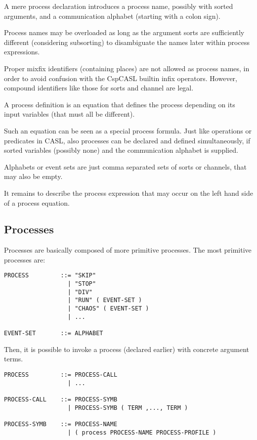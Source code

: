 \documentclass{article}
\begin{document}
A mere process declaration introduces a process name, possibly with sorted
arguments, and a communication alphabet (starting with a colon sign).

Process names may be overloaded as long as the argument sorts are sufficiently
different (considering subsorting) to disambiguate the names later within
process expressions.

Proper mixfix identifiers (containing places) are not allowed as process
names, in order to avoid confusion with the CspCASL builtin infix operators.
However, compound identifiers like those for sorts and channel are legal.

A process definition is an equation that defines the process depending on its
input variables (that must all be different).

Such an equation can be seen as a special process formula. Just like
operations or predicates in CASL, also processes can be declared and defined
simultaneously, if sorted variables (possibly none) and the communication
alphabet is supplied.

Alphabets or event sets are just comma separated sets of sorts or
channels, that may also be empty.

It remains to describe the process expression that may occur on the left hand
side of a process equation.

\subsection{Processes}

Processes are basically composed of more primitive processes. The most
primitive processes are:

\begin{verbatim}
PROCESS         ::= "SKIP"
                  | "STOP"
                  | "DIV"
                  | "RUN" ( EVENT-SET )
                  | "CHAOS" ( EVENT-SET )
                  | ...

EVENT-SET       ::= ALPHABET
\end{verbatim}

Then, it is possible to invoke a process (declared earlier) with concrete
argument terms.

\begin{verbatim}
PROCESS         ::= PROCESS-CALL
                  | ...

PROCESS-CALL    ::= PROCESS-SYMB
                  | PROCESS-SYMB ( TERM ,..., TERM )

PROCESS-SYMB    ::= PROCESS-NAME
                  | ( process PROCESS-NAME PROCESS-PROFILE )
\end{verbatim}
\end{document}
